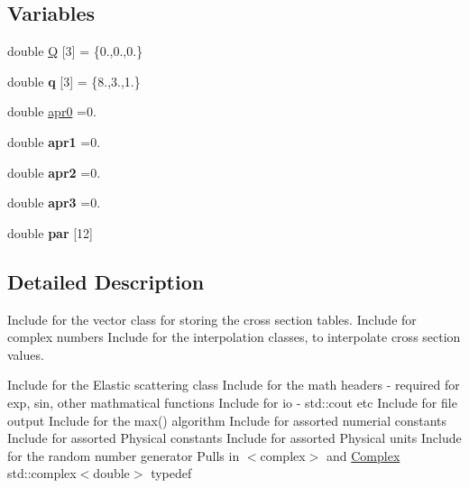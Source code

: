 \subsection*{Variables}
\begin{DoxyCompactItemize}
\item 
double \hyperlink{namespaceParticleTracking_a3e89510a540596b235a808915deb0f7a}{Q} \mbox{[}3\mbox{]} = \{0.,0.,0.\}
\item 
\mbox{\label{namespaceParticleTracking_ac6094fd5ffb2ef6b43a46058308ad461}} 
double {\bfseries q} \mbox{[}3\mbox{]} = \{8.,3.,1.\}
\item 
double \hyperlink{namespaceParticleTracking_af89aac299c3f942237a89b0a2d76271d}{apr0} =0.
\item 
\mbox{\label{namespaceParticleTracking_afe260baa5b365b17ab984693be2784bf}} 
double {\bfseries apr1} =0.
\item 
\mbox{\label{namespaceParticleTracking_a16e416a0a3b3c754f4f92bab3db8b66e}} 
double {\bfseries apr2} =0.
\item 
\mbox{\label{namespaceParticleTracking_ae175679136f68c710b1ad70e996f9f11}} 
double {\bfseries apr3} =0.
\item 
\mbox{\label{namespaceParticleTracking_a2cf15620964c21cdd06e3ecfb12fa1fd}} 
double {\bfseries par} \mbox{[}12\mbox{]}
\end{DoxyCompactItemize}


\subsection{Detailed Description}
Include for the vector class for storing the cross section tables. Include for complex numbers Include for the interpolation classes, to interpolate cross section values.

Include for the Elastic scattering class Include for the math headers -\/ required for exp, sin, other mathmatical functions Include for io -\/ std\+::cout etc Include for file output Include for the max() algorithm Include for assorted numerial constants Include for assorted Physical constants Include for assorted Physical units Include for the random number generator Pulls in $<$complex$>$ and \hyperlink{classComplex}{Complex} std\+::complex$<$double$>$ typedef 

